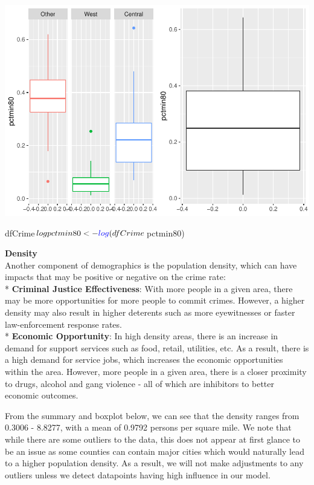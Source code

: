 \documentclass[]{article}
\newenvironment{Shaded}{}{}
\newcommand{\KeywordTok}[1]{\textcolor[rgb]{0.00,0.00,1.00}{#1}}
\newcommand{\NormalTok}[1]{#1}
\newcommand{\OperatorTok}[1]{#1}
\newcommand{\StringTok}[1]{\textcolor[rgb]{0.00,0.50,0.50}{#1}}
\begin{document}
\includegraphics{Bagnard_Gaustad_Hartman_Leung_Lab_3_files/figure-latex/unnamed-chunk-77-1.pdf}

\begin{Shaded}
\begin{Highlighting}[]
\NormalTok{dfCrime}\OperatorTok{$}\NormalTok{logpctmin80 <-}\StringTok{ }\KeywordTok{log}\NormalTok{(dfCrime}\OperatorTok{$}\NormalTok{pctmin80)}
\end{Highlighting}
\end{Shaded}

\textbf{Density}\\
Another component of demographics is the population density, which can
have impacts that may be positive or negative on the crime rate:\\
* \textbf{Criminal Justice Effectiveness}: With more people in a given
area, there may be more opportunities for more people to commit crimes.
However, a higher density may also result in higher deterents such as
more eyewitnesses or faster law-enforcement response rates.\\
* \textbf{Economic Opportunity}: In high density areas, there is an
increase in demand for support services such as food, retail, utilities,
etc. As a result, there is a high demand for service jobs, which
increases the economic opportunities within the area. However, more
people in a given area, there is a closer proximity to drugs, alcohol
and gang violence - all of which are inhibitors to better economic
outcomes.

From the summary and boxplot below, we can see that the density ranges
from 0.3006 - 8.8277, with a mean of 0.9792 persons per square mile. We
note that while there are some outliers to the data, this does not
appear at first glance to be an issue as some counties can contain major
cities which would naturally lead to a higher population density. As a
result, we will not make adjustments to any outliers unless we detect
datapoints having high influence in our model.
\end{document}
